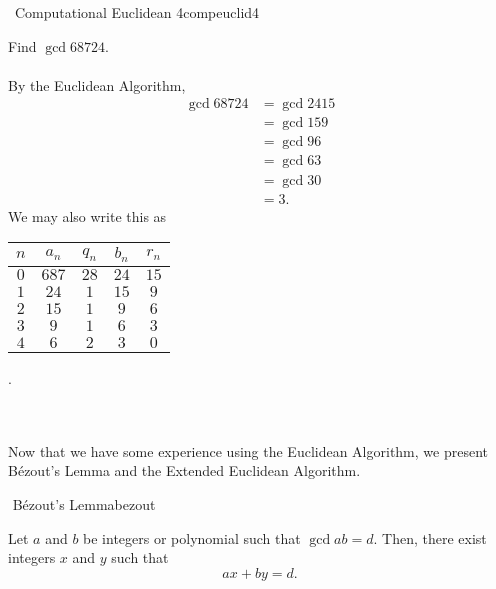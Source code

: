     \begin{exercise}{\Difficulty\,\Difficulty\,\,Computational Euclidean 4}{compeuclid4}
    
        Find \(\gcd{687}{24}\).
        \\
        \\
        By the Euclidean Algorithm,
        \begin{align*}
            \gcd{687}{24}&=\gcd{24}{15} \\
            &=\gcd{15}{9} \\
            &=\gcd{9}{6} \\
            &=\gcd{6}{3} \\
            &=\gcd{3}{0} \\
            &=3.
        \end{align*}
        We may also write this as
        \begin{center}
            \begin{tabular}{c|c|c|c|c}
                \hline
                \(n\) & \(a_n\) & \(q_n\) & \(b_n\) & \(r_n\) \\
                \hline
                \(0\) & \(687\) & \(28\) & \(24\) & \(15\) \\
                \(1\) & \(24\) & \(1\) & \(15\) & \(9\) \\
                \(2\) & \(15\) & \(1\) & \(9\) & \(6\) \\
                \(3\) & \(9\) & \(1\) & \(6\) & \(3\) \\
                \(4\) & \(6\) & \(2\) & \(3\) & \(0\) \\
                \hline
            \end{tabular}.
        \end{center}
    
    \end{exercise}
    \pagebreak
    \vphantom
    \\
    \\
    Now that we have some experience using the Euclidean Algorithm, we present B\'ezout's Lemma and the Extended Euclidean Algorithm.
    \begin{theorem}{\Stop\,\,B\'ezout's Lemma}{bezout}
        
        Let \(a\) and \(b\) be integers or polynomial such that \(\gcd{a}{b}=d\). Then, there exist integers \(x\) and \(y\) such that
        \begin{equation*}
            ax+by=d.
        \end{equation*}
        
    \end{theorem}
